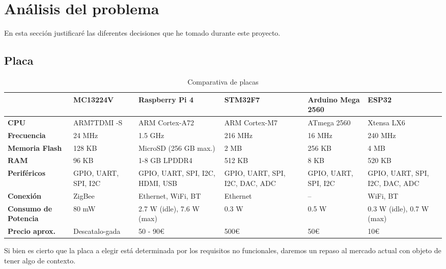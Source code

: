 \chapter{Análisis del problema}

En esta sección justificaré las diferentes decisiones que he tomado durante este proyecto.

\section{Placa}

\begin{table}[h]
\centering
\renewcommand{\arraystretch}{1.2}
\begin{tabularx}{\textwidth}{|X|X|X|X|X|X|}
\hline
\textbf{} 			& \textbf{MC13224V} 	& \textbf{Raspberry Pi 4}	    & \textbf{STM32F7}			& \textbf{Arduino Mega 2560}    & \textbf{ESP32} 		 \\ \hline
\textbf{CPU} 			& ARM7TDMI -S 		& ARM Cortex-A72		    & ARM Cortex-M7   		    	& ATmega 2560			& Xtensa LX6 			 \\ \hline
\textbf{Frecuencia} 		& 24 MHz 		& 1.5 GHz			    & 216 MHz 	  		    	& 16 MHz		    	& 240 MHz			 \\ \hline
\textbf{Memoria Flash} 		& 128 KB 		& MicroSD (256 GB max.)		    & 2 MB 		  	    	& 256 KB 		    	& 4 MB				 \\ \hline
\textbf{RAM} 			& 96 KB 		& 1-8 GB LPDDR4 		    & 512 KB 	  		    	& 8 KB 			    	& 520 KB 			 \\ \hline
\textbf{Periféricos} 		& GPIO, UART, SPI, I2C 	& GPIO, UART, SPI, I2C, HDMI, USB   & GPIO, UART, SPI, I2C, DAC, ADC	& GPIO, UART, SPI, I2C 	    	& GPIO, UART, SPI, I2C, DAC, ADC \\ \hline
\textbf{Conexión} 		& ZigBee 		& Ethernet, WiFi, BT		    & Ethernet				& -- 			    	& WiFi, BT			 \\ \hline
\textbf{Consumo de Potencia} 	& 80 mW 		& 2.7 W (idle), 7.6 W (max) 	    & 0.3 W				& 0.5 W 		    	& 0.3 W (idle), 0.7 W (max) 	 \\ \hline
\textbf{Precio aprox.} 		& Descatalo-gada 	& 50 - 90€ 			    & 500€ 				& 50€			    	& 10€				 \\ \hline
\end{tabularx}
\caption{Comparativa de placas}
\label{Tab:placas}
\end{table}

Si bien es cierto que la placa a elegir está determinada por los requisitos no funcionales, daremos un repaso al mercado actual con objeto de tener algo de contexto.\\

